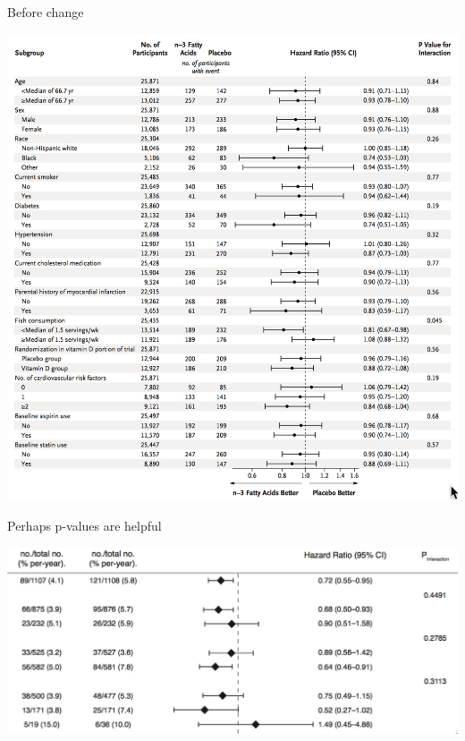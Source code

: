 \documentclass[ignorenonframetext,]{beamer}
\begin{document}
\begin{frame}{Before change}
\protect\hypertarget{before-change}{}

\centering

\includegraphics{../figures/vital_subgroups.jpeg}

\end{frame}

\begin{frame}{Perhaps p-values are helpful}
\protect\hypertarget{perhaps-p-values-are-helpful}{}

\centering

\includegraphics{../figures/me_interaction.jpeg}

\end{frame}
\end{document}
